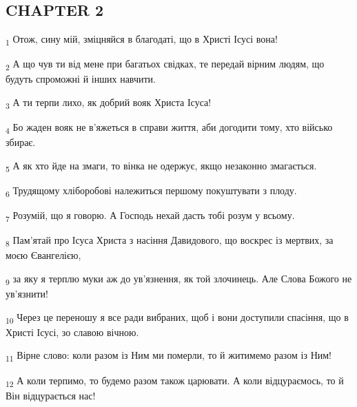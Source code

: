 \subsection{CHAPTER 2}
\begin{tcolorbox}
\textsubscript{1} Отож, сину мій, зміцняйся в благодаті, що в Христі Ісусі вона!
\end{tcolorbox}
\begin{tcolorbox}
\textsubscript{2} А що чув ти від мене при багатьох свідках, те передай вірним людям, що будуть спроможні й інших навчити.
\end{tcolorbox}
\begin{tcolorbox}
\textsubscript{3} А ти терпи лихо, як добрий вояк Христа Ісуса!
\end{tcolorbox}
\begin{tcolorbox}
\textsubscript{4} Бо жаден вояк не в'яжеться в справи життя, аби догодити тому, хто військо збирає.
\end{tcolorbox}
\begin{tcolorbox}
\textsubscript{5} А як хто йде на змаги, то вінка не одержує, якщо незаконно змагається.
\end{tcolorbox}
\begin{tcolorbox}
\textsubscript{6} Трудящому хліборобові належиться першому покуштувати з плоду.
\end{tcolorbox}
\begin{tcolorbox}
\textsubscript{7} Розумій, що я говорю. А Господь нехай дасть тобі розум у всьому.
\end{tcolorbox}
\begin{tcolorbox}
\textsubscript{8} Пам'ятай про Ісуса Христа з насіння Давидового, що воскрес із мертвих, за моєю Євангелією,
\end{tcolorbox}
\begin{tcolorbox}
\textsubscript{9} за яку я терплю муки аж до ув'язнення, як той злочинець. Але Слова Божого не ув'язнити!
\end{tcolorbox}
\begin{tcolorbox}
\textsubscript{10} Через це переношу я все ради вибраних, щоб і вони доступили спасіння, що в Христі Ісусі, зо славою вічною.
\end{tcolorbox}
\begin{tcolorbox}
\textsubscript{11} Вірне слово: коли разом із Ним ми померли, то й житимемо разом із Ним!
\end{tcolorbox}
\begin{tcolorbox}
\textsubscript{12} А коли терпимо, то будемо разом також царювати. А коли відцураємось, то й Він відцурається нас!
\end{tcolorbox}
